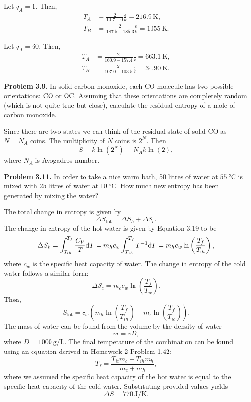 \documentclass[a4paper, 12pt]{config/homework}
\begin{document}
\noindent
Let \(q_A = 1\). Then,
\begin{align*}
T_A &= \frac{2}{10.7 - 0}\frac{\epsilon}{k} = \qty{216.9}{\kelvin}, \\
T_B &= \frac{2}{187.5-185.3}\frac{\epsilon}{k} = \qty{1055}{\kelvin}.
\end{align*}

\noindent
Let \(q_A=60\). Then,
\begin{align*}
T_A &= \frac{2}{160.9 - 157.4}\frac{\epsilon}{k} = \qty{663.1}{\kelvin}, \\
T_B &= \frac{2}{107.0 - 103.5}\frac{\epsilon}{k} = \qty{34.90}{\kelvin}.
\end{align*}


\bigskip
\noindent
\textbf{Problem 3.9.} In solid carbon monoxide, each CO molecule has two possible orientations: CO or OC. Assuming that these orientations are completely random (which is not quite true but close), calculate the residual entropy of a mole of carbon monoxide.

\noindent
Since there are two states we can think of the residual state of solid CO as \(N=N_A\) coins. The multiplicity of \(N\) coins is \(2^N\). Then,
\[S = k\ln\left(2^N\right) = N_A k \ln(2),\]
where \(N_A\) is Avogadros number.


\pagebreak
\noindent
\textbf{Problem 3.11.} In order to take a nice warm bath, 50 litres of water at \(\qty{55}{\celsius}\) is mixed with 25 litres of water at \(\qty{10}{\celsius}\). How much new entropy has been generated by mixing the water?

\noindent
The total change in entropy is given by
\[\Delta S_\text{tot} = \Delta S_h + \Delta S_c.\]
The change in entropy of the hot water is given by Equation 3.19 to be
\[\Delta S_h = \int_{T_{ih}}^{T_f}{\frac{C_V}{T} \text{d}T} = m_h c_w \int_{T_{ih}}^{T_f}{T^{-1} \text{d}T} = m_h c_w\ln\left(\frac{T_f}{T_{ih}}\right),\]
where \(c_w\) is the specific heat capacity of water. The change in entropy of the cold water follows a similar form:
\[\Delta S_c = m_c c_w \ln\left(\frac{T_f}{T_{ic}}\right).\]
Then,
\[S_\text{tot} = c_w \left(m_h \ln\left(\frac{T_f}{T_{ih}}\right) + m_c \ln\left(\frac{T_f}{T_{ic}}\right)\right).\]
The mass of water can be found from the volume by the density of water
\[m = vD,\]
where \(D=\qty{1000}{\gram\per\liter}\). The final temperature of the combination can be found using an equation derived in Homework 2 Problem 1.42:
\[T_f = \frac{T_{ic}m_c + T_{ih}m_h}{m_c + m_h},\]
where we assumed the specific heat capacity of the hot water is equal to the specific heat capacity of the cold water. Substituting provided values yields
\[\Delta S = \qty{770}{\joule\per\kelvin}.\]
\end{document}

